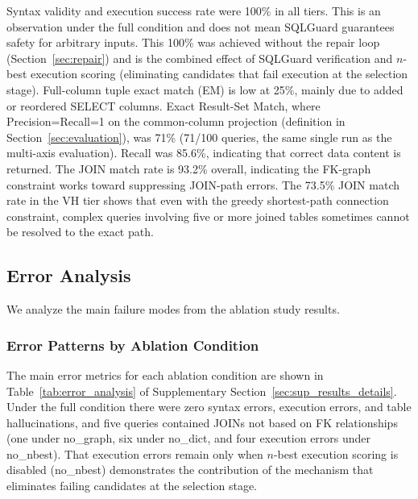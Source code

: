 Syntax validity and execution success rate were 100\% in all tiers. This is an observation under the full condition and does not mean SQLGuard guarantees safety for arbitrary inputs. This 100\% was achieved without the repair loop (Section~\ref{sec:repair}) and is the combined effect of SQLGuard verification and $n$-best execution scoring (eliminating candidates that fail execution at the selection stage). Full-column tuple exact match (EM) is low at 25\%, mainly due to added or reordered SELECT columns. Exact Result-Set Match, where Precision=Recall=1 on the common-column projection (definition in Section~\ref{sec:evaluation}), was 71\% (71/100 queries, the same single run as the multi-axis evaluation). Recall was 85.6\%, indicating that correct data content is returned. The JOIN match rate is 93.2\% overall, indicating the FK-graph constraint works toward suppressing JOIN-path errors. The 73.5\% JOIN match rate in the VH tier shows that even with the greedy shortest-path connection constraint, complex queries involving five or more joined tables sometimes cannot be resolved to the exact path.
\subsection{Error Analysis}
\label{sec:error_analysis}

We analyze the main failure modes from the ablation study results.

\subsubsection{Error Patterns by Ablation Condition}

The main error metrics for each ablation condition are shown in Table~\ref{tab:error_analysis} of Supplementary Section~\ref{sec:sup_results_details}. Under the full condition there were zero syntax errors, execution errors, and table hallucinations, and five queries contained JOINs not based on FK relationships (one under no\_graph, six under no\_dict, and four execution errors under no\_nbest). That execution errors remain only when $n$-best execution scoring is disabled (no\_nbest) demonstrates the contribution of the mechanism that eliminates failing candidates at the selection stage.

